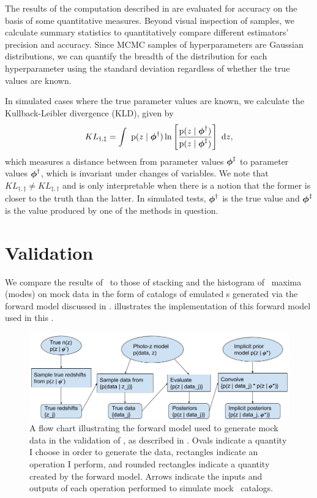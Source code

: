 The results of the computation described in  are evaluated for accuracy on the basis of some quantitative measures.  
Beyond visual inspection of samples, we calculate summary statistics to quantitatively compare different estimators' precision and accuracy.  
Since MCMC samples of hyperparameters are Gaussian distributions, we can quantify the breadth of the distribution for each hyperparameter using the standard deviation regardless of whether the true values are known.  

In simulated cases where the true parameter values are known, we calculate the Kullback-Leibler divergence (KLD), given by 
\begin{equation}
\eqlabel{eqn:kl}
KL_{\dagger,\ddagger} = \integral{\pr{z \gvn \ndphi^{\dagger}} \ln \left[ \frac{\pr{z \gvn \ndphi^{\dagger}}}{\pr{z \gvn \ndphi^{\ddagger}}} \right]}{z} ,
\end{equation}
which measures a distance between from parameter values ${\boldsymbol{\phi}}^{\ddagger}$ to parameter values ${\boldsymbol{\phi}}^{\dagger}$, which is invariant under changes of variables.  
We note that $KL_{\dagger,\ddagger} \neq KL_{\ddagger,\dagger}$ and is only interpretable when there is a notion that the former is closer to the truth than the latter.
In simulated tests, ${\boldsymbol{\phi}}^{\dagger}$ is the true value and ${\boldsymbol{\phi}}^{\ddagger}$ is the value produced by one of the methods in question.  

\section{Validation}

We compare the results of \Chippr\ to those of stacking and the histogram of \pzpdf\ maxima (modes) on mock data in the form of catalogs of emulated \pzpdf s generated via the forward model discussed in .
 illustrates the implementation of this forward model used in this \paper.

\begin{figure}
	\begin{center}
		\includegraphics[width=\textwidth]{figures/chippr/flowchart.png}
		\caption{A flow chart illustrating the forward model used to generate mock data in the validation of \Chippr, as described in .
		Ovals indicate a quantity I choose in order to generate the data, rectangles indicate an operation I perform, and rounded rectangles indicate a quantity created by the forward model.
		Arrows indicate the inputs and outputs of each operation performed to simulate mock \pzpdf\ catalogs.}
	\end{center}
\end{figure}

